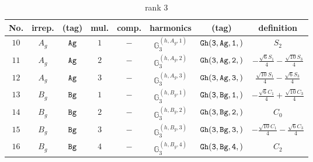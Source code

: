 \documentclass[fleqn,8pt]{jsarticle}
\begin{document}
\begin{table}[ht!]
\begin{center}
\caption{rank 3}
\renewcommand{\arraystretch}{1.3}
\begin{tabular}{cccccccc} \hline \hline
No. & irrep. & (tag) & mul. & comp. & harmonics & (tag) & definition \\ \hline
$ 10 $ & $ A_{g} $ & $ {\tt Ag} $ & $ 1 $ & $ - $ & $ \mathbb{G}_{3}^{(h,A_{g},1)} $ & $ {\tt Gh(3,Ag,1,)} $ & $ S_{2} $ \\
$ 11 $ & $ A_{g} $ & $ {\tt Ag} $ & $ 2 $ & $ - $ & $ \mathbb{G}_{3}^{(h,A_{g},2)} $ & $ {\tt Gh(3,Ag,2,)} $ & $ - \frac{\sqrt{6} S_{1}}{4} - \frac{\sqrt{10} S_{3}}{4} $ \\
$ 12 $ & $ A_{g} $ & $ {\tt Ag} $ & $ 3 $ & $ - $ & $ \mathbb{G}_{3}^{(h,A_{g},3)} $ & $ {\tt Gh(3,Ag,3,)} $ & $ \frac{\sqrt{10} S_{1}}{4} - \frac{\sqrt{6} S_{3}}{4} $ \\
$ 13 $ & $ B_{g} $ & $ {\tt Bg} $ & $ 1 $ & $ - $ & $ \mathbb{G}_{3}^{(h,B_{g},1)} $ & $ {\tt Gh(3,Bg,1,)} $ & $ - \frac{\sqrt{6} C_{1}}{4} + \frac{\sqrt{10} C_{3}}{4} $ \\
$ 14 $ & $ B_{g} $ & $ {\tt Bg} $ & $ 2 $ & $ - $ & $ \mathbb{G}_{3}^{(h,B_{g},2)} $ & $ {\tt Gh(3,Bg,2,)} $ & $ C_{0} $ \\
$ 15 $ & $ B_{g} $ & $ {\tt Bg} $ & $ 3 $ & $ - $ & $ \mathbb{G}_{3}^{(h,B_{g},3)} $ & $ {\tt Gh(3,Bg,3,)} $ & $ - \frac{\sqrt{10} C_{1}}{4} - \frac{\sqrt{6} C_{3}}{4} $ \\
$ 16 $ & $ B_{g} $ & $ {\tt Bg} $ & $ 4 $ & $ - $ & $ \mathbb{G}_{3}^{(h,B_{g},4)} $ & $ {\tt Gh(3,Bg,4,)} $ & $ C_{2} $ \\
 \hline \hline
\end{tabular}
\end{center}
\end{table}
\end{document}
